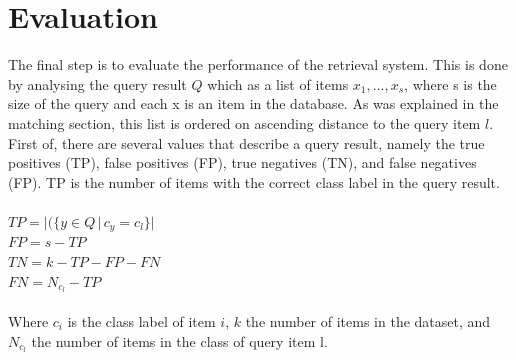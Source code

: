 \documentclass{bigdata}
\begin{document}
\section{Evaluation}
The final step is to evaluate the performance of the retrieval system. This is done by analysing the query result $Q$ which as a list of items ${x_1,...,x_s}$, where s is the size of the query and each x is an item in the database. As was explained in the matching section, this list is ordered on ascending distance to the query item $l$. First of, there are several values that describe a query result, namely the true positives (TP), false positives (FP), true negatives (TN), and false negatives (FP).
TP is the number of items with the correct class label in the query result.\\ 
\\
$TP = |(\{y \in Q\, |\, c_y = c_l\}|$\\
$FP = s - TP$\\
$TN = k - TP - FP - FN$\\
$FN = N_{c_l} - TP$\\
\\
Where $c_i$ is the class label of item $i$, $k$ the number of items in the dataset, and $N_{c_l}$ the number of items in the class of query item l. 
\end{document}
